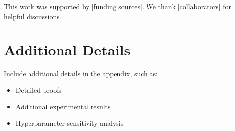 \documentclass{article}
\begin{document}
This work was supported by [funding sources]. We thank [collaborators] for
helpful discussions.




\appendix
\section{Additional Details}
\label{app:details}

Include additional details in the appendix, such as:
\begin{itemize}
    \item Detailed proofs
    \item Additional experimental results
    \item Hyperparameter sensitivity analysis
\end{itemize}
\end{document}
